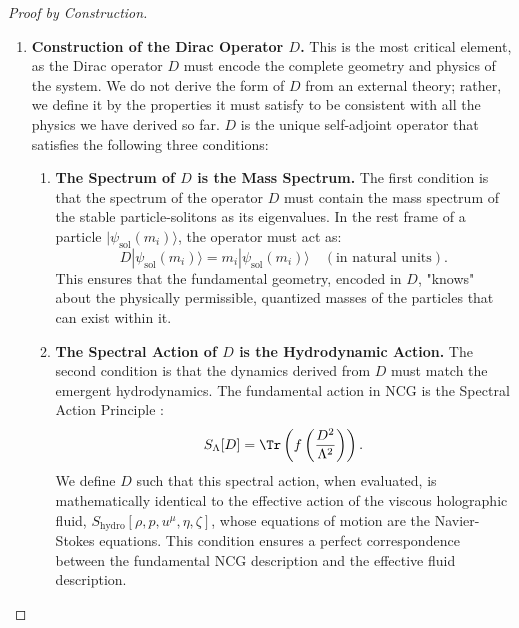 \documentclass[11pt, letterpaper]{report}
\theoremstyle{plain} %
\theoremstyle{definition} %
\theoremstyle{remark} %
\begin{document}
\begin{proof}[Proof by Construction]
\begin{enumerate}
    \item \textbf{Construction of the Dirac Operator $D$.}
    This is the most critical element, as the Dirac operator $D$ must encode the complete geometry and physics of the system. We do not derive the form of $D$ from an external theory; rather, we define it by the properties it must satisfy to be consistent with all the physics we have derived so far. $D$ is the unique self-adjoint operator that satisfies the following three conditions:

    \begin{enumerate}[label=(\alph*)]
        \item \textbf{The Spectrum of $D$ is the Mass Spectrum.} The first condition is that the spectrum of the operator $D$ must contain the mass spectrum of the stable particle-solitons as its eigenvalues. In the rest frame of a particle $|\psi_{\text{sol}}(m_i)\rangle$, the operator must act as:
        \begin{equation}
            D |\psi_{\text{sol}}(m_i)\rangle = m_i |\psi_{\text{sol}}(m_i)\rangle \quad (\text{in natural units}).
        \end{equation}
        This ensures that the fundamental geometry, encoded in $D$, "knows" about the physically permissible, quantized masses of the particles that can exist within it.

        \item \textbf{The Spectral Action of $D$ is the Hydrodynamic Action.} The second condition is that the dynamics derived from $D$ must match the emergent hydrodynamics. The fundamental action in NCG is the Spectral Action Principle \cite{Chamseddine1997SpectralAction}:
        \begin{equation}
            S_{\Lambda}[D] = \Tr\left( f\left(\frac{D^2}{\Lambda^2}\right) \right).
        \end{equation}
        We define $D$ such that this spectral action, when evaluated, is mathematically identical to the effective action of the viscous holographic fluid, $S_{\text{hydro}}[\rho, p, u^\mu, \eta, \zeta]$, whose equations of motion are the Navier-Stokes equations. This condition ensures a perfect correspondence between the fundamental NCG description and the effective fluid description.


\end{enumerate}
\end{enumerate}
\end{proof}
\end{document}
